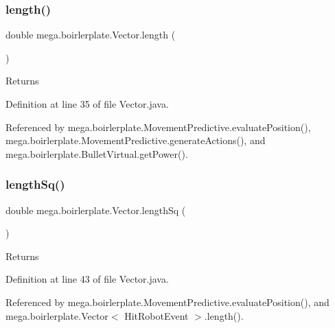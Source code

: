 \mbox{\label{classmega_1_1boirlerplate_1_1_vector_a38e2f1f039a104a02be2204c85305fed}} 
\subsubsection{\texorpdfstring{length()}{length()}}
{\footnotesize\ttfamily double mega.\+boirlerplate.\+Vector.\+length (\begin{DoxyParamCaption}{ }\end{DoxyParamCaption})}

\begin{DoxyReturn}{Returns}

\end{DoxyReturn}


Definition at line 35 of file Vector.\+java.



Referenced by mega.\+boirlerplate.\+Movement\+Predictive.\+evaluate\+Position(), mega.\+boirlerplate.\+Movement\+Predictive.\+generate\+Actions(), and mega.\+boirlerplate.\+Bullet\+Virtual.\+get\+Power().

\mbox{\label{classmega_1_1boirlerplate_1_1_vector_a234a98845efc07e17192bfc4d42d7296}} 
\subsubsection{\texorpdfstring{length\+Sq()}{lengthSq()}}
{\footnotesize\ttfamily double mega.\+boirlerplate.\+Vector.\+length\+Sq (\begin{DoxyParamCaption}{ }\end{DoxyParamCaption})}

\begin{DoxyReturn}{Returns}

\end{DoxyReturn}


Definition at line 43 of file Vector.\+java.



Referenced by mega.\+boirlerplate.\+Movement\+Predictive.\+evaluate\+Position(), and mega.\+boirlerplate.\+Vector$<$ Hit\+Robot\+Event $>$.\+length().

